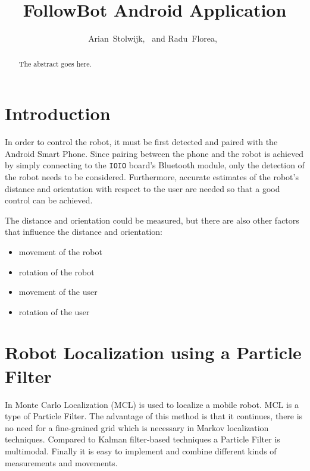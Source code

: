 \documentclass[journal]{IEEEtran}
\begin{document}
\title{FollowBot Android Application}


\author{Arian~Stolwijk,~
        and Radu~Florea,~}%

%
{}
\maketitle

\begin{abstract}
The abstract goes here.
\end{abstract}

\section{Introduction}



In order to control the robot, it must be first detected and paired with the
Android Smart Phone. Since pairing between the phone and the robot is achieved
by simply connecting to the \texttt{IOIO} board's Bluetooth module, only the
detection of the robot needs to be considered. Furthermore, accurate estimates
of the robot's distance and orientation with respect to the user are needed so
that a good control can be achieved.

The distance and orientation could be measured, but there are also other
factors that influence the distance and orientation:

\begin{itemize}
 \item movement of the robot
 \item rotation of the robot
 \item movement of the user
 \item rotation of the user
\end{itemize}

\section{Robot Localization using a Particle Filter}

In \cite{fox1999monte} Monte Carlo Localization (MCL) is used to localize a
mobile robot. MCL is a type of Particle Filter. The advantage of this method
is that it continues, there is no need for a fine-grained grid which is
necessary in Markov localization techniques. Compared to Kalman filter-based
techniques a Particle Filter is multimodal. Finally it is easy to implement and
combine different kinds of measurements and movements.
\end{document}
